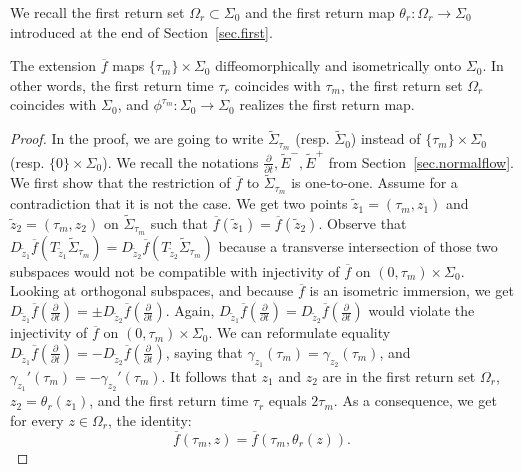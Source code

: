 We recall the first return set $\Omega_r \subset \Sigma_0$ and the first return map $\theta_r: \Omega_r \to \Sigma_0$ introduced at the end of Section~\ref{sec.first}.

\begin{prop}
The extension ${\overline{f}}$ maps $\{ \tau_m\} \times {\Sigma}_{0}$ diffeomorphically and isometrically onto $\Sigma_0$. In other words, the first return time $\tau_r$ coincides with $\tau_m$, the first return set $\Omega_r$ coincides with $\Sigma_0$, and $\phi^{\tau_m}: \Sigma_0 \to \Sigma_0$ realizes the first return map.
\end{prop}

\begin{proof}
In the proof, we are going to write $\tilde{\Sigma}_{\tau_m}$ (resp. $\tilde{\Sigma}_0$) instead of
$\{\tau_m \} \times \Sigma_0$ (resp. $\{0\} \times \Sigma_0$). We recall the notations $\frac{\partial}{\partial t}, \tilde{E}^-,\tilde{E}^+$ from Section~\ref{sec.normalflow}. We first show that the restriction of ${\overline{f}}$ to $\tilde{\Sigma}_{\tau_m}$ is one-to-one. Assume for a contradiction that it is not the case. We get two points $\tilde{z}_1=(\tau_m,z_1)$ and $\tilde{z}_2=(\tau_m,z_2)$ on $\tilde{\Sigma}_{\tau_m}$ such that ${\overline{f}}(\tilde{z}_1)={\overline{f}}(\tilde{z}_2)$. Observe that $D_{\tilde{z}_1}{\overline{f}}(T_{\tilde{z}_1}\tilde{\Sigma}_{\tau_m})=D_{\tilde{z}_2}{\overline{f}}(T_{\tilde{z}_2}\tilde{\Sigma}_{\tau_m})$ because a transverse intersection of those two subspaces would not be compatible with injectivity of ${\overline{f}}$ on $(0,\tau_m) \times \Sigma_0$. Looking at orthogonal subspaces, and because ${\overline{f}}$ is an isometric immersion, we get $D_{\tilde{z}_1}{\overline{f}}(\frac{\partial}{\partial t})=\pm D_{\tilde{z}_2}{\overline{f}}(\frac{\partial}{\partial t})$. Again, $D_{\tilde{z}_1}{\overline{f}}(\frac{\partial}{\partial t})= D_{\tilde{z}_2}{\overline{f}}(\frac{\partial}{\partial t})$ would violate the injectivity of ${\overline{f}}$ on $(0,\tau_m) \times \Sigma_0$. We can reformulate equality $D_{\tilde{z}_1}{\overline{f}}(\frac{\partial}{\partial t})=- D_{\tilde{z}_2}{\overline{f}}(\frac{\partial}{\partial t})$, saying that $\gamma_{z_1}(\tau_m)=\gamma_{z_2}(\tau_m)$, and $\gamma_{z_1}'(\tau_m)=-\gamma_{z_2}'(\tau_m)$. It follows that $z_1$ and $z_2$ are in the first return set $\Omega_r$, $z_2=\theta_r(z_1)$, and the first return time $\tau_r$ equals $2 \tau_m$. As a consequence, we get for every $z \in \Omega_r$, the identity:
\[
{\overline{f}}(\tau_m,z)={\overline{f}}(\tau_m,\theta_r(z)).
\]
\end{proof}
